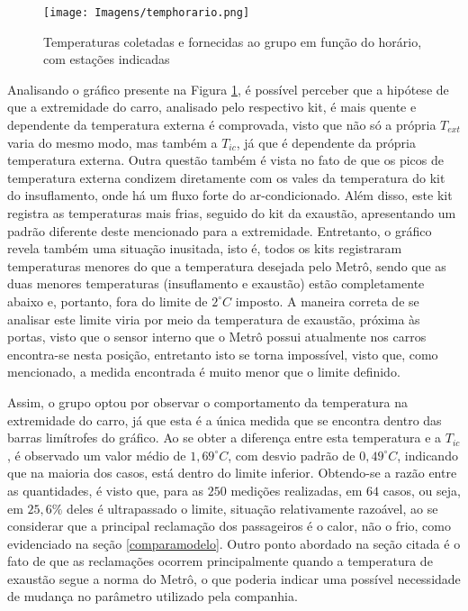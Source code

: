 \documentclass[acronym,symbols,table]{fei}
\begin{document}
\begin{figure}[!htb]
    \centering
    \caption{Temperaturas coletadas e fornecidas ao grupo em função do horário, com estações indicadas}
    \texttt{[image: Imagens/temphorario.png]}
    \label{fig:temphorario}
\end{figure}

Analisando o gráfico presente na Figura \ref{fig:temphorario}, é possível perceber que a hipótese de que a extremidade do carro, analisado pelo respectivo kit, é mais quente e dependente da temperatura externa é comprovada, visto que não só a própria $T_{ext}$ varia do mesmo modo, mas também a $T_{ic}$, já que é dependente da própria temperatura externa. Outra questão também é vista no fato de que os picos de temperatura externa condizem diretamente com os vales da temperatura do kit do insuflamento, onde há um fluxo forte do ar-condicionado. Além disso, este kit registra as temperaturas mais frias, seguido do kit da exaustão, apresentando um padrão diferente deste mencionado para a extremidade. Entretanto, o gráfico revela também uma situação inusitada, isto é, todos os kits registraram temperaturas menores do que a temperatura desejada pelo Metrô, sendo que as duas menores temperaturas (insuflamento e exaustão) estão completamente abaixo e, portanto, fora do limite de $2 ^\circ C$ imposto. A maneira correta de se analisar este limite viria por meio da temperatura de exaustão, próxima às portas, visto que o sensor interno que o Metrô possui atualmente nos carros encontra-se nesta posição, entretanto isto se torna impossível, visto que, como mencionado, a medida encontrada é muito menor que o limite definido.

Assim, o grupo optou por observar o comportamento da temperatura na extremidade do carro, já que esta é a única medida que se encontra dentro das barras limítrofes do gráfico. Ao se obter a diferença entre esta temperatura e a $T_{ic}$, é observado um valor médio de $1,69 ^\circ C$, com desvio padrão de $0,49 ^\circ C$, indicando que na maioria dos casos, está dentro do limite inferior. Obtendo-se a razão entre as quantidades, é visto que, para as $250$ medições realizadas, em $64$ casos, ou seja, em $25,6\%$ deles é ultrapassado o limite, situação relativamente razoável, ao se considerar que a principal reclamação dos passageiros é o calor, não o frio, como evidenciado na seção \ref{comparamodelo}. Outro ponto abordado na seção citada é o fato de que as reclamações ocorrem principalmente quando a temperatura de exaustão segue a norma do Metrô, o que poderia indicar uma possível necessidade de mudança no parâmetro utilizado pela companhia. 
\end{document}
